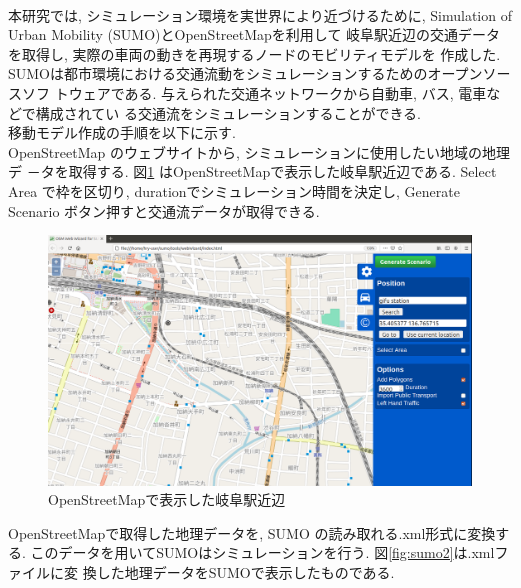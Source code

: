 \\
\indent 本研究では, シミュレーション環境を実世界により近づけるために, 
Simulation of Urban Mobility (SUMO)\cite{sumo}とOpenStreetMap\cite{openstreetmap}を利用して
岐阜駅近辺の交通データを取得し, 実際の車両の動きを再現するノードのモビリティモデルを
作成した. SUMOは都市環境における交通流動をシミュレーションするためのオープンソースソフ
トウェアである. 与えられた交通ネットワークから自動車, バス, 電車などで構成されてい
る交通流をシミュレーションすることができる. \\
\indent 移動モデル作成の手順を以下に示す. \\[1em]
\indent OpenStreetMap のウェブサイトから, シミュレーションに使用したい地域の地理デ
－タを取得する. 図\ref{fig:sumo1} はOpenStreetMapで表示した岐阜駅近辺である. Select
Area で枠を区切り, durationでシミュレーション時間を決定し, Generate Scenario
ボタン押すと交通流データが取得できる.\\
\begin{figure}[t]
  \centering
  \includegraphics[scale=0.3]{figures/SUMO1.png}
  \caption{OpenStreetMapで表示した岐阜駅近辺}
  \label{fig:sumo1}
\end{figure}
\FloatBarrier
\indent OpenStreetMapで取得した地理データを, SUMO の読み取れる.xml形式に変換する. 
このデータを用いてSUMOはシミュレーションを行う. 図\ref{fig:sumo2}は.xmlファイルに変
換した地理データをSUMOで表示したものである. \\
